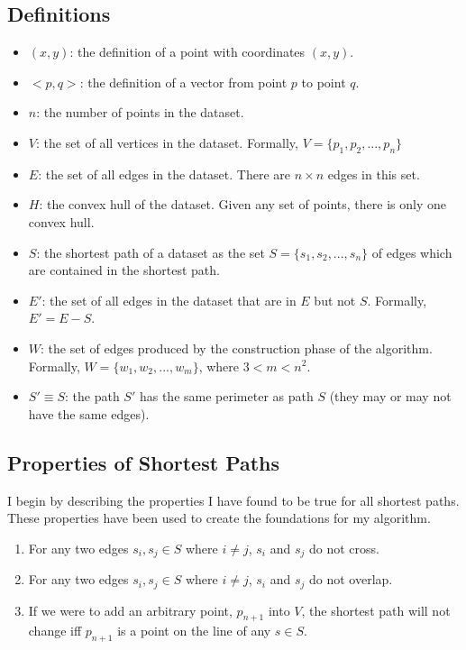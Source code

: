 \documentclass[12pt]{article}
\begin{document}
\subsection{Definitions}\label{subsec:def}
\begin{itemize}
\item $(x,y)$: the definition of a point with coordinates $(x,y)$.
\item $<p,q>$: the definition of a vector from point $p$ to point $q$.
\item $n$: the number of points in the dataset.
\item $V$: the set of all vertices in the dataset.
Formally, $V = \{p_1, p_2, ..., p_n\}$
\item $E$: the set of all edges in the dataset.
There are $n \times n$ edges in this set.
\item $H$: the convex hull of the dataset. Given any set of points,
there is only one convex hull.
\item $S$: the shortest path of a dataset as the set $S = \{s_1, s_2, ..., s_n\}$
of edges which are contained in the shortest path.
\item $E'$: the set of all edges in the dataset that are in $E$ but not $S$.
Formally, $E' = E - S$.
\item $W$: the set of edges produced by the construction phase of the algorithm.
Formally, $W = \{w_1, w_2, ..., w_m\}$, where $3 < m < n^2$.
\item $S' \equiv S$: the path $S'$ has the same perimeter as path $S$
(they may or may not have the same edges).
\end{itemize}

\subsection{Properties of Shortest Paths}\label{subsec:props}
I begin by describing the properties I have found to be true for all shortest
paths. These properties have been used to create the foundations for my algorithm.
\begin{enumerate}
\item For any two edges $s_i,s_j \in S$ where $i \neq j$, $s_i$ and $s_j$ do not cross. 
\item For any two edges $s_i,s_j \in S$ where $i \neq j$, $s_i$ and $s_j$ do not overlap. 
\item If we were to add an arbitrary point, $p_{n+1}$ into $V$, the shortest path
will not change iff $p_{n+1}$ is a point on the line of any $s \in S$.
\end{enumerate}
\end{document}
